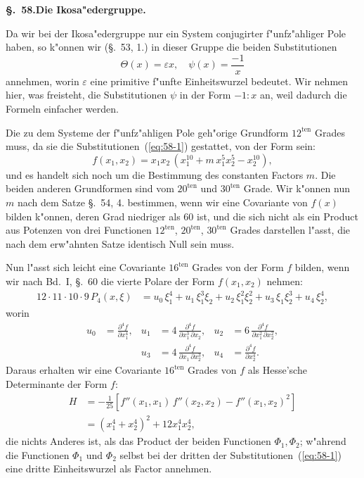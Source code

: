 \documentclass[12pt,a4paper]{article}
\theoremstyle{definition}
\begin{document}
\noindent\textbf{\S.~58.}\quad\textbf{Die Ikosa"edergruppe.}
\vspace{0.3cm}

Da wir bei der Ikosa"edergruppe nur ein System conjugirter f"unfz"ahliger Pole haben, so k"onnen wir (\S.~53, 1.) in dieser Gruppe die beiden Substitutionen
\begin{equation}\label{eq:58-1}
\Theta(x) = \varepsilon x, \quad \psi(x) = \frac{-1}{x}
\end{equation}
annehmen, worin $\varepsilon$ eine primitive f"unfte Einheitswurzel bedeutet. Wir nehmen hier, was freisteht, die Substitutionen $\psi$ in der Form $-1 : x$ an, weil dadurch die Formeln einfacher werden.

Die zu dem Systeme der f"unfz"ahligen Pole geh"orige Grundform $12^{\text{ten}}$ Grades muss, da sie die Substitutionen~(\ref{eq:58-1}) gestattet, von der Form sein:
\begin{equation}\label{eq:58-2}
f(x_1, x_2) = x_1 x_2\,(x_1^{10} + m\,x_1^5 x_2^5 - x_2^{10}),
\end{equation}
und es handelt sich noch um die Bestimmung des constanten Factors $m$. Die beiden anderen Grundformen sind vom $20^{\text{ten}}$ und $30^{\text{ten}}$ Grade. Wir k"onnen nun $m$ nach dem Satze \S.~54, 4. bestimmen, wenn wir eine Covariante von $f(x)$ bilden k"onnen, deren Grad niedriger als $60$ ist, und die sich nicht als ein Product aus Potenzen von drei Functionen $12^{\text{ten}}$, $20^{\text{ten}}$, $30^{\text{ten}}$ Grades darstellen l"asst, die nach dem erw"ahnten Satze identisch Null sein muss.

Nun l"asst sich leicht eine Covariante $16^{\text{ten}}$ Grades von der Form $f$ bilden, wenn wir nach Bd.~I, \S.~60 die vierte Polare der Form $f(x_1, x_2)$ nehmen:
\begin{align*}
12 \cdot 11 \cdot 10 \cdot 9\,P_4(x, \xi) &= u_0\,\xi_1^4 + u_1\,\xi_1^3\xi_2 + u_2\,\xi_1^2\xi_2^2 + u_3\,\xi_1\xi_2^3 + u_4\,\xi_2^4,
\end{align*}
worin
\begin{align*}
u_0 &= \frac{\partial^4 f}{\partial x_1^4}, & u_1 &= 4\,\frac{\partial^4 f}{\partial x_1^3\,\partial x_2}, & u_2 &= 6\,\frac{\partial^4 f}{\partial x_1^2\,\partial x_2^2}, \\
&& u_3 &= 4\,\frac{\partial^4 f}{\partial x_1\,\partial x_2^3}, & u_4 &= \frac{\partial^4 f}{\partial x_2^4}.
\end{align*}
Daraus erhalten wir eine Covariante $16^{\text{ten}}$ Grades von $f$ als Hesse'sche Determinante der Form $f$:
\begin{align*}
H &= -\frac{1}{25}\left[f''(x_1, x_1)\,f''(x_2, x_2) - f''(x_1, x_2)^2\right] \\
&= (x_1^4 + x_2^4)^2 + 12x_1^4 x_2^4,
\end{align*}
die nichts Anderes ist, als das Product der beiden Functionen $\Phi_1, \Phi_2$; w"ahrend die Functionen $\Phi_1$ und $\Phi_2$ selbst bei der dritten der Substitutionen~(\ref{eq:58-1}) eine dritte Einheitswurzel als Factor annehmen.
\end{document}
